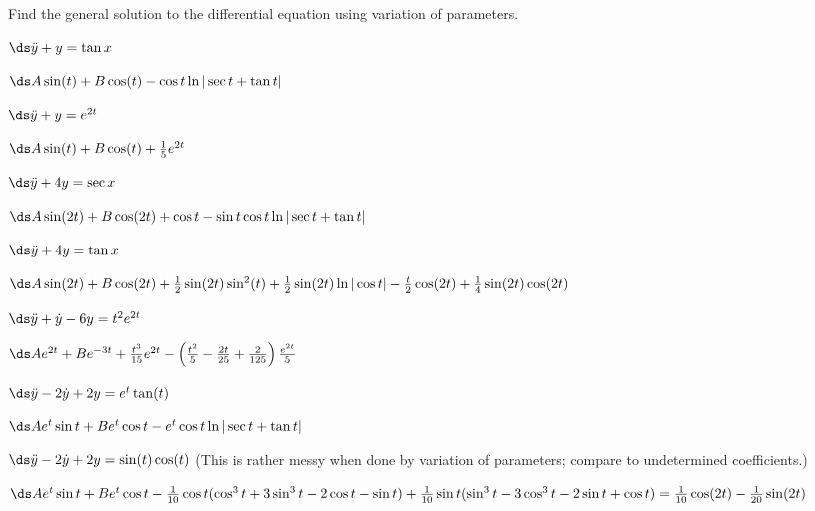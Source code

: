 \begin{exercises}

Find the general solution to the differential equation using variation
of parameters.

\exercise $\ds\ddot y+y=\tan x$
\begin{answer} $\ds A\sin(t)+B\cos(t)-\hfill\break\cos t\ln|\sec t+\tan t|$
\end{answer}

\exercise $\ds\ddot y+y=e^{2t}$
\begin{answer} $\ds A\sin(t)+B\cos(t)+{1\over5}e^{2t}$
\end{answer}

\exercise $\ds\ddot y+4y=\sec x$
\begin{answer} $\ds A\sin(2t)+B\cos(2t)+\cos t-\sin t\cos t\ln|\sec t+\tan t|$
\end{answer}

\exercise $\ds\ddot y+4y=\tan x$
\begin{answer} $\ds A\sin(2t)+B\cos(2t)+{1\over2}\sin(2t)\sin^2(t)+
{1\over2}\sin(2t)\ln|\cos t|-{t\over2}\cos(2t)+{1\over4}\sin(2t)\cos(2t)$
\end{answer}

\exercise $\ds\ddot y+\dot y-6y=t^2e^{2t}$
\begin{answer} $\ds Ae^{2t}+Be^{-3t}+{t^3\over15}e^{2t}-\left({t^2\over5}
-{2t\over25}+{2\over125}\right){e^{2t}\over5}$
\end{answer}

\exercise $\ds\ddot y-2\dot y+2y=e^{t}\tan(t)$
\begin{answer} $\ds Ae^{t}\sin t+Be^{t}\cos t-e^t\cos t\ln|\sec t+\tan t|$
\end{answer}

\exercise $\ds\ddot y-2\dot y+2y=\sin(t)\cos(t)$ (This is rather messy
when done by variation of parameters; compare to undetermined coefficients.)
\begin{answer} $\ds Ae^{t}\sin t+Be^{t}\cos t-
{1\over10}\cos t(\cos^3 t+3\sin^3 t-2\cos t-\sin t)+
{1\over10}\sin t(\sin^3 t-3\cos^3 t-2\sin t+\cos t)=
{1\over10}\cos(2t)-{1\over20}\sin(2t)$
\end{answer}

\end{exercises}
